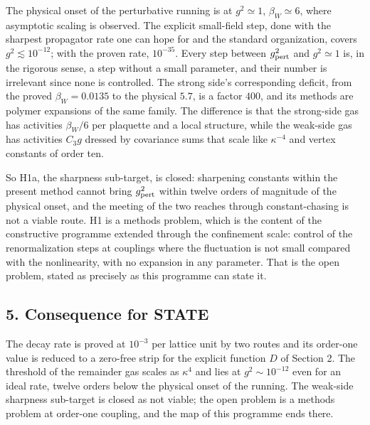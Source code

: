 \documentclass[11pt,a4paper]{article}
\begin{document}
The physical onset of the perturbative running is at \(g^2\simeq1\),
\(\beta_W\simeq6\), where asymptotic scaling is observed. The explicit
small-field step, done with the sharpest propagator rate one can hope
for and the standard organization, covers \(g^2\lesssim10^{-12}\); with
the proven rate, \(10^{-35}\). Every step between \(g^2_{\rm pert}\) and
\(g^2\simeq1\) is, in the rigorous sense, a step without a small
parameter, and their number is irrelevant since none is controlled. The
strong side's corresponding deficit, from the proved \(\beta_W=0.0135\)
to the physical \(5.7\), is a factor \(400\), and its methods are
polymer expansions of the same family. The difference is that the
strong-side gas has activities \(\beta_W/6\) per plaquette and a local
structure, while the weak-side gas has activities \(C_3g\) dressed by
covariance sums that scale like \(\kappa^{-4}\) and vertex constants of
order ten.

So H1a, the sharpness sub-target, is closed: sharpening constants within
the present method cannot bring \(g_{\rm pert}^2\) within twelve orders
of magnitude of the physical onset, and the meeting of the two reaches
through constant-chasing is not a viable route. H1 is a methods problem,
which is the content of the constructive programme extended through the
confinement scale: control of the renormalization steps at couplings
where the fluctuation is not small compared with the nonlinearity, with
no expansion in any parameter. That is the open problem, stated as
precisely as this programme can state it.

\hypertarget{consequence-for-state}{%
\subsection{5. Consequence for STATE}\label{consequence-for-state}}

The decay rate is proved at \(10^{-3}\) per lattice unit by two routes
and its order-one value is reduced to a zero-free strip for the explicit
function \(D\) of Section 2. The threshold of the remainder gas scales
as \(\kappa^4\) and lies at \(g^2\sim10^{-12}\) even for an ideal rate,
twelve orders below the physical onset of the running. The weak-side
sharpness sub-target is closed as not viable; the open problem is a
methods problem at order-one coupling, and the map of this programme
ends there.
\end{document}
